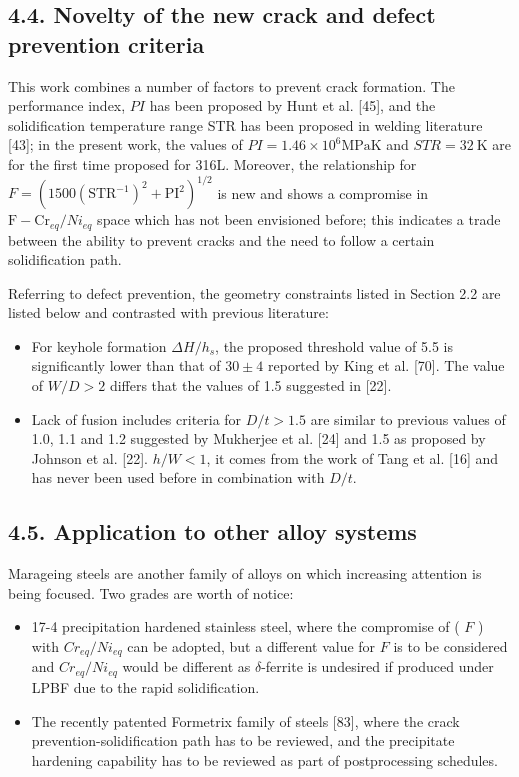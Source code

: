 \documentclass[10pt]{article}
\begin{document}
\subsection*{4.4. Novelty of the new crack and defect prevention criteria}
This work combines a number of factors to prevent crack formation. The performance index, $P I$ has been proposed by Hunt et al. [45], and the solidification temperature range STR has been proposed in welding literature [43]; in the present work, the values of $P I=1.46 \times 10^{6} \mathrm{MPa} \mathrm{K}$ and $S T R=32 \mathrm{~K}$ are for the first time proposed for 316L. Moreover, the relationship for $F=\left(1500\left(\mathrm{STR}^{-1}\right)^{2}+\mathrm{PI}^{2}\right)^{1 / 2}$ is new and shows a compromise in $\mathrm{F}-\mathrm{Cr}_{e q} / N i_{e q}$ space which has not been envisioned before; this indicates a trade between the ability to prevent cracks and the need to follow a certain solidification path.

Referring to defect prevention, the geometry constraints listed in Section 2.2 are listed below and contrasted with previous literature:

\begin{itemize}
  \item For keyhole formation $\Delta H / h_{s}$, the proposed threshold value of 5.5 is significantly lower than that of $30 \pm 4$ reported by King et al. [70]. The value of $W / D>2$ differs that the values of 1.5 suggested in [22].
  \item Lack of fusion includes criteria for $D / t>1.5$ are similar to previous values of 1.0, 1.1 and 1.2 suggested by Mukherjee et al. [24] and 1.5 as proposed by Johnson et al. [22]. $h / W<1$, it comes from the work of Tang et al. [16] and has never been used before in combination with $D / t$.
\end{itemize}

\subsection*{4.5. Application to other alloy systems}
Marageing steels are another family of alloys on which increasing attention is being focused. Two grades are worth of notice:

\begin{itemize}
  \item 17-4 precipitation hardened stainless steel, where the compromise of ( $F$ ) with $C r_{e q} / N i_{e q}$ can be adopted, but a different value for $F$ is to be considered and $C r_{e q} / N i_{e q}$ would be different as $\delta$-ferrite is undesired if produced under LPBF due to the rapid solidification.

  \item The recently patented Formetrix family of steels [83], where the crack prevention-solidification path has to be reviewed, and the precipitate hardening capability has to be reviewed as part of postprocessing schedules.

\end{itemize}
\end{document}
